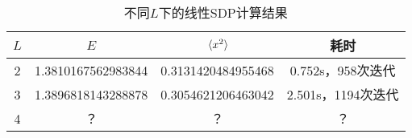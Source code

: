 
\begin{table}
    \caption{不同$L$下的线性SDP计算结果}
    \label{tbl:linear-sdp-oscillator-result}
    \centering
    \begin{tabular}{cccc}
        \toprule
          $L$ & $E$ & $\expval*{x^2}$ & 耗时 \\
        \midrule
          2 & 1.3810167562983844  & 0.3131420484955468 & 0.752s，958次迭代  \\
          3 & 1.3896818143288878  & 0.3054621206463042 & 2.501s，1194次迭代 \\
          4 & ？  & ？& ？  \\
        \bottomrule
    \end{tabular}
\end{table}